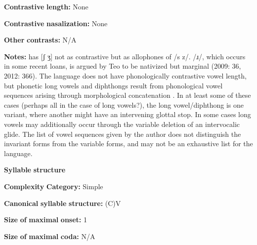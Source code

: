 \begin{styleBody}
\textbf{Contrastive} \textbf{length:} None
\end{styleBody}

\begin{styleBody}
\textbf{Contrastive} \textbf{nasalization:} None
\end{styleBody}

\begin{styleBody}
\textbf{Other} \textbf{contrasts:} N/A
\end{styleBody}

\begin{styleBody}
\textbf{Notes:} \citet{Sreedhar1980} has [ʃ ʒ] not as contrastive but as allophones of /s z/. /ɹ/, which occurs in some recent loans, is argued by Teo to be nativized but marginal (2009: 36, 2012: 366). The language does not have phonologically contrastive vowel length, but phonetic long vowels and diphthongs result from phonological vowel sequences arising through morphological concatenation \citep[58-9]{Teo2009}. In at least some of these cases (perhaps all in the case of long vowels?), the long vowel/diphthong is one variant, where another might have an intervening glottal stop. In some cases long vowels may additionally occur through the variable deletion of an intervocalic glide. The list of vowel sequences given by the author does not distinguish the invariant forms from the variable forms, and may not be an exhaustive list for the language.
\end{styleBody}

\begin{styleBody}
\textbf{Syllable} \textbf{structure}
\end{styleBody}

\begin{styleBody}
\textbf{Complexity} \textbf{Category:} Simple
\end{styleBody}

\begin{styleBody}
\textbf{Canonical} \textbf{syllable} \textbf{structure:} (C)V \citep[57-64]{Teo2009}
\end{styleBody}

\begin{styleBody}
\textbf{Size} \textbf{of} \textbf{maximal} \textbf{onset:} 1
\end{styleBody}

\begin{styleBody}
\textbf{Size} \textbf{of} \textbf{maximal} \textbf{coda:} N/A
\end{styleBody}

